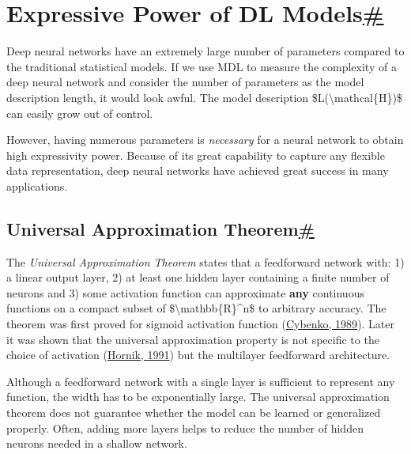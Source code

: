 \section{\texorpdfstring{Expressive Power of DL Models\hyperref[expressive-power-of-dl-models]{\#}}{Expressive Power of DL Models\#}}\label{expressive-power-of-dl-models}

Deep neural networks have an extremely large number of parameters compared to the traditional statistical models. If we use MDL to measure the complexity of a deep neural network and consider the number of parameters as the model description length, it would look awful. The model description \$L(\textbackslash mathcal\{H\})\$ can easily grow out of control.

However, having numerous parameters is \emph{necessary} for a neural network to obtain high expressivity power. Because of its great capability to capture any flexible data representation, deep neural networks have achieved great success in many applications.

\subsection{\texorpdfstring{Universal Approximation Theorem\hyperref[universal-approximation-theorem]{\#}}{Universal Approximation Theorem\#}}\label{universal-approximation-theorem}

The \emph{Universal Approximation Theorem} states that a feedforward network with: 1) a linear output layer, 2) at least one hidden layer containing a finite number of neurons and 3) some activation function can approximate \textbf{any} continuous functions on a compact subset of \$\textbackslash mathbb\{R\}\^{}n\$ to arbitrary accuracy. The theorem was first proved for sigmoid activation function (\href{https://pdfs.semanticscholar.org/05ce/b32839c26c8d2cb38d5529cf7720a68c3fab.pdf}{Cybenko, 1989}). Later it was shown that the universal approximation property is not specific to the choice of activation (\href{http://zmjones.com/static/statistical-learning/hornik-nn-1991.pdf}{Hornik, 1991}) but the multilayer feedforward architecture.

Although a feedforward network with a single layer is sufficient to represent any function, the width has to be exponentially large. The universal approximation theorem does not guarantee whether the model can be learned or generalized properly. Often, adding more layers helps to reduce the number of hidden neurons needed in a shallow network.


